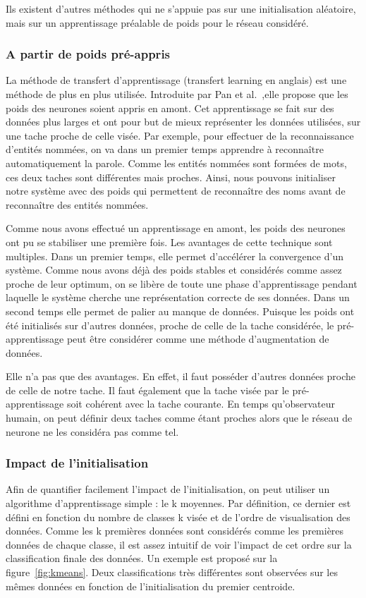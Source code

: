 Ils existent d'autres méthodes qui ne s'appuie pas sur une initialisation aléatoire, mais sur un apprentissage préalable de poids pour le réseau considéré.

\subsubsection{A partir de poids pré-appris}
La méthode de transfert d'apprentissage (transfert learning en anglais) est une méthode de plus en plus utilisée. Introduite par Pan et al.~\cite{Pan2009},elle propose que les poids des neurones soient appris en amont. Cet apprentissage se fait sur des données plus larges et ont pour but de mieux représenter les données utilisées, sur une tache proche de celle visée. Par exemple, pour effectuer de la reconnaissance d'entités nommées, on va dans un premier temps apprendre à reconnaître automatiquement la parole. Comme les entités nommées sont formées de mots, ces deux taches sont différentes mais proches. Ainsi, nous pouvons initialiser notre système avec des poids qui permettent de reconnaître des noms avant de reconnaître des entités nommées.

Comme nous avons effectué un apprentissage en amont, les poids des neurones ont pu se stabiliser une première fois. Les avantages de cette technique sont multiples. Dans un premier temps, elle permet d’accélérer la convergence d'un système. Comme nous avons déjà des poids stables et considérés comme assez proche de leur optimum, on se libère de toute une phase d'apprentissage pendant laquelle le système cherche une représentation correcte de ses données. Dans un second temps elle permet de palier au manque de données. Puisque les poids ont été initialisés sur d'autres données, proche de celle de la tache considérée, le pré-apprentissage peut être considérer comme une méthode d'augmentation de données.

Elle n'a pas que des avantages. En effet, il faut posséder d'autres données proche de celle de notre tache. Il faut également que la tache visée par le pré-apprentissage soit cohérent avec la tache courante. En temps qu'observateur humain, on peut définir deux taches comme étant proches alors que le réseau de neurone ne les considéra pas comme tel.

\subsubsection{Impact de l'initialisation}
Afin de quantifier facilement l'impact de l’initialisation, on peut utiliser un algorithme d'apprentissage simple : le k moyennes. Par définition, ce dernier est défini en fonction du nombre de classes k visée et de l'ordre de visualisation des données. Comme les k premières données sont considérés comme les premières données de chaque classe, il est assez intuitif de voir l'impact de cet ordre sur la classification finale des données. Un exemple est proposé sur la figure~\ref{fig:kmeans}. Deux classifications très différentes sont observées sur les mêmes données en fonction de l’initialisation du premier centroide.



